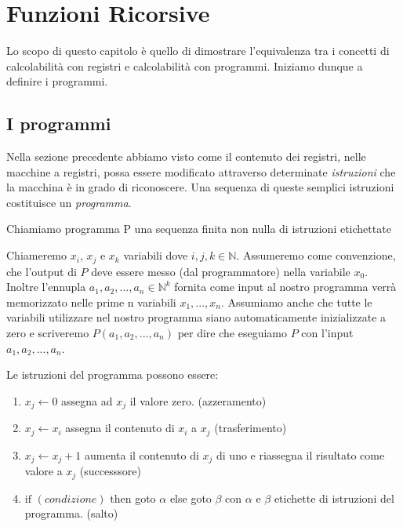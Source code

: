 \chapter{Funzioni Ricorsive}
\label{lemma diagonalizzazione}

Lo scopo di questo capitolo \`e quello di dimostrare l'equivalenza tra
i concetti di calcolabilit\`a con registri e calcolabilit\`a con
programmi.  Iniziamo dunque a definire i programmi.

\section{I programmi}
Nella sezione precedente abbiamo visto come il contenuto dei registri,
nelle macchine a registri, possa essere modificato attraverso
determinate \emph{istruzioni} che la macchina \`e in grado di
riconoscere. Una sequenza di queste semplici istruzioni costituisce un
\emph{programma}.


\begin{programmi}
Chiamiamo programma P una sequenza finita non nulla di istruzioni etichettate
\end{programmi}

Chiameremo $x_i$, $x_j$ e $x_k$ variabili dove $i,j,k \in \mathbb{N}$. Assumeremo come convenzione,
che l'output di $P$ deve essere messo (dal programmatore) nella variabile $x_0$.
Inoltre l'ennupla $a_1, a_2, ..., a_n \in \mathbb{N}^k $ fornita come input al nostro programma verrà memorizzato nelle prime n variabili $x_1, ..., x_n$.
Assumiamo anche che tutte le variabili utilizzare nel nostro programma siano automaticamente inizializzate a zero e scriveremo $P(a_1, a_2, ..., a_n)$ per dire che eseguiamo $P$ con l'input $a_1, a_2, ..., a_n$.

Le istruzioni del programma possono essere:

\begin{enumerate}
\item $x_j \leftarrow 0$ assegna ad $x_j$ il valore zero. (azzeramento)
\item $x_j \leftarrow x_i $ assegna il contenuto di $x_i$ a $x_j$ (trasferimento)
\item $x_j \leftarrow x_j+1$ aumenta il contenuto di $x_j$ di uno e 
  riassegna il risultato come valore a $x_j$ (successsore)
\item $\textrm{if }(condizione) $ then goto $\alpha$ else goto $\beta$ con
  $\alpha$ e $\beta$ etichette di istruzioni del programma. (salto)
\end{enumerate}
	
